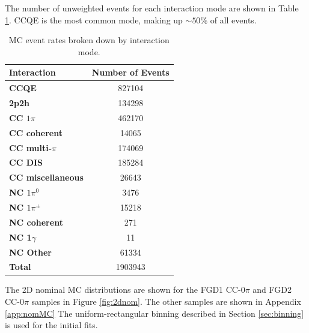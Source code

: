 The number of unweighted events for each interaction mode are shown in Table \ref{tab:modes}. CCQE is the most common mode, making up $\sim50\%$ of all events.

\begin{center}
\begin{table}
\center
\begin{tabular}{l||c}
\hline \hline
\textbf{Interaction} & \textbf{Number of Events}\\
\hline
\hline
\textbf{CCQE} & 827104 \\
\textbf{2p2h} & 134298 \\
\textbf{CC $1\pi$} & 462170 \\
\textbf{CC coherent} & 14065 \\
\textbf{CC multi-$\pi$} & 174069 \\
\textbf{CC DIS} & 185284 \\
\textbf{CC miscellaneous} & 26643 \\
\textbf{NC $1\pi^0$} & 3476 \\
\textbf{NC $1\pi^{\pm}$} & 15218 \\
\textbf{NC coherent} & 271 \\
\textbf{NC 1$\gamma$} & 11 \\
\textbf{NC Other} & 61334 \\ \hline
\textbf{Total} & 1903943\\ \hline\hline
\end{tabular}
\caption{MC event rates broken down by interaction mode.}
\label{tab:modes}
\end{table}
\end{center}

The 2D nominal MC distributions are shown for the FGD1 CC-0$\pi$ and FGD2 CC-0$\pi$ samples in Figure \ref{fig:2dnom}. The other samples are shown in Appendix \ref{app:nomMC} The uniform-rectangular binning described in Section \ref{sec:binning} is used for the initial fits. 

